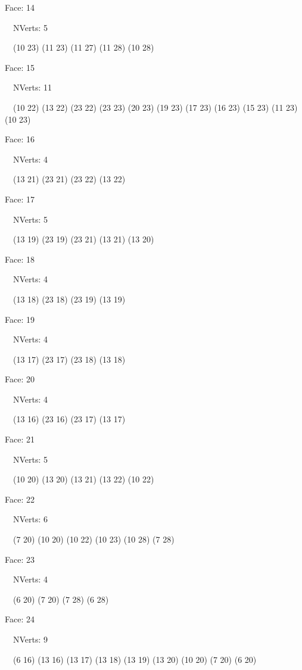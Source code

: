 \documentclass{article}
\begin{document}
{\footnotesize 

Face: 14

\   \    NVerts: 5

 \   \   (10 23) (11 23) (11 27) (11 28) (10 28)}

{\footnotesize 

Face: 15

\   \    NVerts: 11

 \   \   (10 22) (13 22) (23 22) (23 23) (20 23) (19 23) (17 23) (16 23) (15 23) (11 23) (10 23)}

{\footnotesize 

Face: 16

\   \    NVerts: 4

 \   \   (13 21) (23 21) (23 22) (13 22)}

{\footnotesize 

Face: 17

\   \    NVerts: 5

 \   \   (13 19) (23 19) (23 21) (13 21) (13 20)}

{\footnotesize 

Face: 18

\   \    NVerts: 4

 \   \   (13 18) (23 18) (23 19) (13 19)}

{\footnotesize 

Face: 19

\   \    NVerts: 4

 \   \   (13 17) (23 17) (23 18) (13 18)}

{\footnotesize 

Face: 20

\   \    NVerts: 4

 \   \   (13 16) (23 16) (23 17) (13 17)}

{\footnotesize 

Face: 21

\   \    NVerts: 5

 \   \   (10 20) (13 20) (13 21) (13 22) (10 22)}

{\footnotesize 

Face: 22

\   \    NVerts: 6

 \   \   (7 20) (10 20) (10 22) (10 23) (10 28) (7 28)}

{\footnotesize 

Face: 23

\   \    NVerts: 4

 \   \   (6 20) (7 20) (7 28) (6 28)}

{\footnotesize 

Face: 24

\   \    NVerts: 9

 \   \   (6 16) (13 16) (13 17) (13 18) (13 19) (13 20) (10 20) (7 20) (6 20)}
\end{document}
